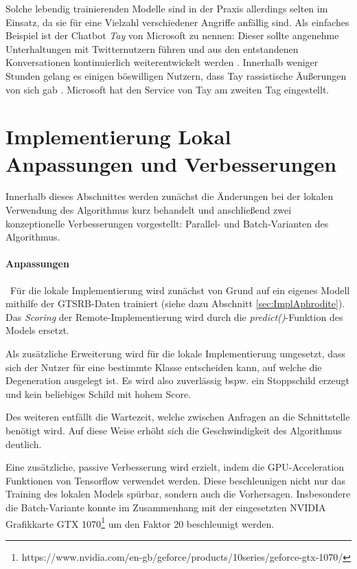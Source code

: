 Solche lebendig trainierenden Modelle sind in der Praxis allerdings selten im Einsatz, da sie für eine Vielzahl verschiedener Angriffe anfällig sind. 
Als einfaches Beispiel ist der Chatbot \textit{Tay} von Microsoft zu nennen: 
Dieser sollte angenehme Unterhaltungen mit Twitternutzern führen und aus den entstandenen Konversationen kontinuierlich weiterentwickelt werden \cite{mstay}. 
Innerhalb weniger Stunden gelang es einigen böswilligen Nutzern, dass Tay rassistische Äußerungen von sich gab \cite{mstaydown}. 
Microsoft hat den Service von Tay am zweiten Tag eingestellt. 
\section[Implementierung Lokal]{Implementierung Lokal \newline Anpassungen und Verbesserungen}
\label{sec:DegenerationLokal}

Innerhalb dieses Abschnittes werden zunächst die Änderungen bei der lokalen Verwendung des Algorithmus kurz behandelt und anschließend zwei konzeptionelle Verbesserungen vorgestellt: 
Parallel- und Batch-Varianten des Algorithmus. 

\paragraph{Anpassungen} ~\newline Für die lokale Implementierung wird zunächst von Grund auf ein eigenes Modell mithilfe der \ac{GTSRB}-Daten trainiert (siehe dazu Abschnitt \ref{sec:ImplAphrodite}). 
Das \textit{Scoring} der Remote-Implementierung wird durch die \textit{predict()}-Funktion des Models ersetzt.

Als zusätzliche Erweiterung wird für die lokale Implementierung umgesetzt, dass sich der Nutzer für eine bestimmte Klasse entscheiden kann, auf welche die Degeneration ausgelegt ist. 
Es wird also zuverlässig bspw. ein Stoppschild erzeugt und kein beliebiges Schild mit hohem Score. 

Des weiteren entfällt die Wartezeit, welche zwischen Anfragen an die Schnittstelle benötigt wird. 
Auf diese Weise erhöht sich die Geschwindigkeit des Algorithmus deutlich. 

Eine zusätzliche, passive Verbesserung wird erzielt, indem die GPU-Acceleration Funktionen von Tensorflow verwendet werden.
Diese beschleunigen nicht nur das Training des lokalen Models spürbar, sondern auch die Vorhersagen. 
Insbesondere die Batch-Variante konnte im Zusammenhang mit der eingesetzten NVIDIA Grafikkarte GTX 1070\footnote{https://www.nvidia.com/en-gb/geforce/products/10series/geforce-gtx-1070/} um den Faktor 20 beschleunigt werden.


